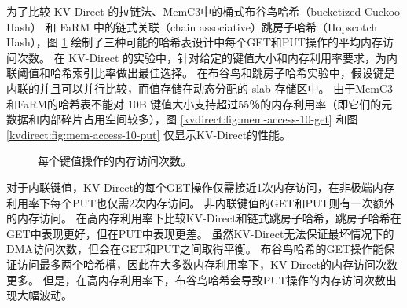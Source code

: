 为了比较 KV-Direct 的拉链法、MemC3中的桶式布谷鸟哈希（bucketized Cuckoo Hash）\cite {fan2013memc3} 和 FaRM \cite {dragojevic2014farm} 中的链式关联（chain associative）跳房子哈希（Hopscotch Hash），图 \ref {kvdirect:fig:mem-access-tput} 绘制了三种可能的哈希表设计中每个GET和PUT操作的平均内存访问次数。
在 KV-Direct 的实验中，针对给定的键值大小和内存利用率要求，为内联阈值和哈希索引比率做出最佳选择。
在布谷鸟和跳房子哈希实验中，假设键是内联的并且可以并行比较，而值存储在动态分配的 slab 存储区中。
由于MemC3和FaRM的哈希表不能对 10B 键值大小支持超过55％的内存利用率（即它们的元数据和内部碎片占用空间较多），图 \ref {kvdirect:fig:mem-access-10-get} 和图 \ref {kvdirect:fig:mem-access-10-put} 仅显示KV-Direct的性能。




\begin{figure}[htbp]
	\centering
	
	\vfill
	
	\caption{每个键值操作的内存访问次数。}
	\label{kvdirect:fig:mem-access-tput}
\end{figure}


对于内联键值，KV-Direct的每个GET操作仅需接近1次内存访问，在非极端内存利用率下每个PUT也仅需2次内存访问。
非内联键值的GET和PUT则有一次额外的内存访问。
在高内存利用率下比较KV-Direct和链式跳房子哈希，跳房子哈希在GET中表现更好，但在PUT中表现更差。
虽然KV-Direct无法保证最坏情况下的DMA访问次数，但会在GET和PUT之间取得平衡。
布谷鸟哈希的GET操作能保证访问最多两个哈希槽，因此在大多数内存利用率下，KV-Direct的内存访问次数更多。
但是，在高内存利用率下，布谷鸟哈希会导致PUT操作的内存访问次数出现大幅波动。



\label{kvdirect:sec:hashtable-eval}

